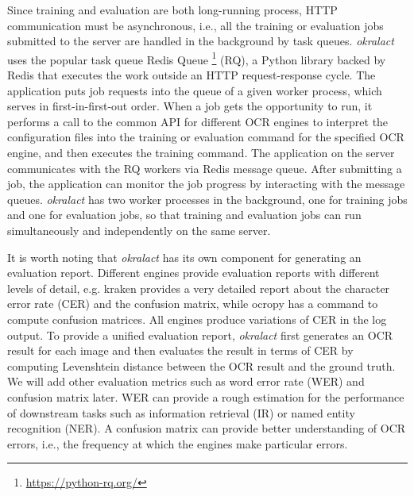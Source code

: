 \documentclass[sigconf]{acmart}
\begin{document}



Since training and evaluation are both long-running process, HTTP communication must be asynchronous,
i.e., all the training or evaluation
jobs submitted to the server are handled in the background by task queues. \textit{okralact} uses the popular task queue Redis Queue \footnote{\url{https://python-rq.org/}} (RQ),
a Python library backed by Redis that
executes the work outside an HTTP request-response cycle. The application puts job
requests into the queue of a given worker process, which serves in
first-in-first-out order. When a job gets the opportunity to run, it performs a call to the common
API for different OCR engines to interpret the configuration files into the
training or evaluation command for the specified OCR engine, and then executes the training command. The application on the server communicates with the RQ workers via Redis message queue. After submitting a job, the application can monitor the job progress by interacting with the message queues. \textit{okralact} has two worker processes in the background, one for training jobs and one for evaluation jobs, so that training and evaluation jobs can run simultaneously and independently on the same server.

It is worth noting that \textit{okralact} has its own component for generating an evaluation report. Different engines provide evaluation reports with different levels of detail, e.g. kraken provides a very detailed report about the character error rate (CER) and the confusion matrix, while ocropy has a command to compute confusion matrices. All engines produce variations of CER in the log output. To provide a unified evaluation report, \textit{okralact} first generates an OCR result for each image and then evaluates the result in terms of CER by computing Levenshtein distance between the OCR result and the ground truth. We will add other evaluation metrics such as word error rate (WER) and confusion matrix later. WER can provide a rough estimation for the performance of downstream tasks such as information retrieval (IR) or named entity recognition (NER). A confusion matrix can provide better understanding of OCR errors, i.e., the frequency at which the engines make particular errors.
\end{document}
